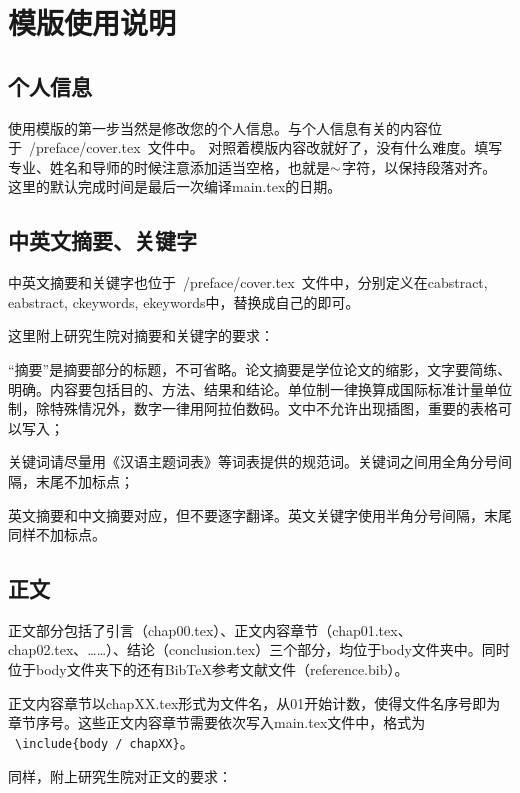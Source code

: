 ﻿%

\chapter{模版使用说明}
\label{chap01}

\section{个人信息}
使用模版的第一步当然是修改您的个人信息。与个人信息有关的内容位于~{/preface/cover.tex}~文件中。
对照着模版内容改就好了，没有什么难度。填写专业、姓名和导师的时候注意添加适当空格，也就是$\scriptsize{\sim}$字符，以保持段落对齐。
这里的默认完成时间是最后一次编译main.tex的日期。

\section{中英文摘要、关键字}
中英文摘要和关键字也位于~{/preface/cover.tex}~文件中，分别定义在cabstract, eabstract, ckeywords, ekeywords中，替换成自己的即可。

这里附上研究生院对摘要和关键字的要求：
\begin{asparaenum}
\item “摘要”是摘要部分的标题，不可省略。论文摘要是学位论文的缩影，文字要简练、明确。内容要包括目的、方法、结果和结论。单位制一律换算成国际标准计量单位制，除特殊情况外，数字一律用阿拉伯数码。文中不允许出现插图，重要的表格可以写入；
\item 关键词请尽量用《汉语主题词表》等词表提供的规范词。关键词之间用全角分号间隔，末尾不加标点；
\item 英文摘要和中文摘要对应，但不要逐字翻译。英文关键字使用半角分号间隔，末尾同样不加标点。
\end{asparaenum}

\section{正文}
正文部分包括了引言（chap00.tex）、正文内容章节（chap01.tex、chap02.tex、……）、结论（conclusion.tex）三个部分，均位于body文件夹中。同时位于body文件夹下的还有Bib\TeX{}参考文献文件（reference.bib）。

正文内容章节以chapXX.tex形式为文件名，从01开始计数，使得文件名序号即为章节序号。这些正文内容章节需要依次写入main.tex文件中，格式为
~\texttt{\footnotesize \textbackslash include\{body / chapXX\}}。

同样，附上研究生院对正文的要求：

